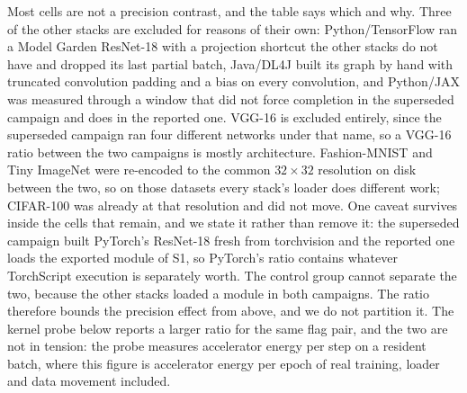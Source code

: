 

Most cells are not a precision contrast, and the table says which and why. Three
of the other stacks are excluded for reasons of their own:
Python/TensorFlow ran a Model Garden ResNet-18 with a projection shortcut the
other stacks do not have and dropped its last partial batch, Java/DL4J built its
graph by hand with truncated convolution padding and a bias on every
convolution, and Python/JAX was measured through a window that did not force
completion in the superseded campaign and does in the reported one. VGG-16 is
excluded entirely, since the superseded campaign ran four different networks
under that name, so a VGG-16 ratio between the two campaigns is mostly
architecture.
Fashion-MNIST and Tiny ImageNet were re-encoded to the common $32\times32$
resolution on disk between the two, so on those datasets every stack's loader
does different work; CIFAR-100 was already at that resolution and did not move.
One caveat survives inside the cells that remain, and we state it rather than
remove it: the superseded campaign built PyTorch's ResNet-18 fresh from
torchvision and the reported one loads the exported module of S1, so PyTorch's ratio contains
whatever TorchScript execution is separately worth. The control group cannot
separate the two, because the other stacks loaded a module in both campaigns.
The ratio therefore bounds the precision effect from above, and we do not
partition it. The kernel probe below reports a larger ratio for the same flag
pair, and the two are not in tension: the probe measures accelerator energy per
step on a resident batch, where this figure is accelerator energy per epoch of
real training, loader and data movement included.

